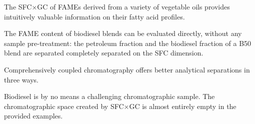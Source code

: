 The SFC×GC of FAMEs derived from a variety of vegetable oils provides intuitively
valuable information on their fatty acid profiles.

The FAME content of biodiesel blends can be evaluated directly, without any
sample pre-treatment: the petroleum fraction and the biodiesel fraction of a B50
blend are separated completely separated on the SFC dimension.

Comprehensively coupled chromatography offers better analytical separations in three ways. 

Biodiesel is by no means a challenging chromatographic sample. The
chromatographic space created by SFC×GC is almost entirely empty in the provided
examples. 

